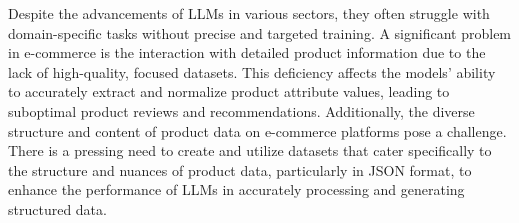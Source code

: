 \label{section:problema}
Despite the advancements of LLMs in various sectors, they often struggle with domain-specific tasks without precise and targeted training. A significant problem in e-commerce is the interaction with detailed product information due to the lack of high-quality, focused datasets. This deficiency affects the models' ability to accurately extract and normalize product attribute values, leading to suboptimal product reviews and recommendations. Additionally, the diverse structure and content of product data on e-commerce platforms pose a challenge. There is a pressing need to create and utilize datasets that cater specifically to the structure and nuances of product data, particularly in JSON format, to enhance the performance of LLMs in accurately processing and generating structured data. 